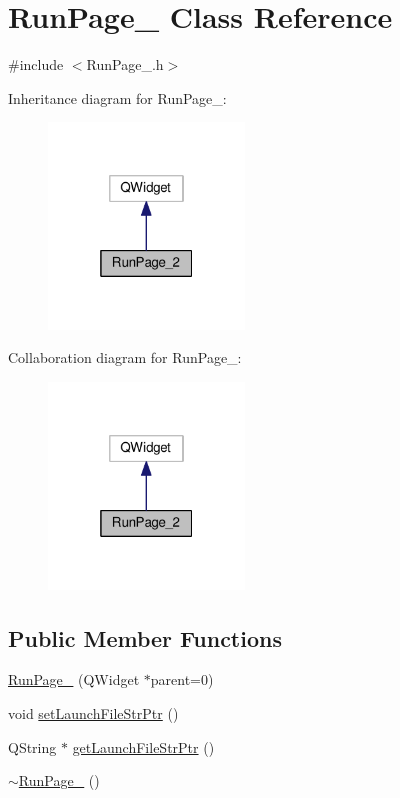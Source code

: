 \hypertarget{class_run_page__2}{\section{Run\-Page\-\_ Class Reference}
\label{class_run_page__2}
}


{\ttfamily \#include $<$Run\-Page\-\_.\-h$>$}



Inheritance diagram for Run\-Page\-\_\-:\nopagebreak
\begin{figure}[H]
\begin{center}
\leavevmode
\includegraphics[width=148pt]{class_run_page__2__inherit__graph}
\end{center}
\end{figure}


Collaboration diagram for Run\-Page\-\_\-:\nopagebreak
\begin{figure}[H]
\begin{center}
\leavevmode
\includegraphics[width=148pt]{class_run_page__2__coll__graph}
\end{center}
\end{figure}
\subsection*{Public Member Functions}
\begin{DoxyCompactItemize}
\item 
\hyperlink{class_run_page__2_a6c183b2d481d952509f2b1f97d48bc8d}{Run\-Page\-\_} (Q\-Widget $\ast$parent=0)
\item 
void \hyperlink{class_run_page__2_ad351ea26fe784be1bfa2cee01a62fd06}{set\-Launch\-File\-Str\-Ptr} ()
\item 
Q\-String $\ast$ \hyperlink{class_run_page__2_af4529d1908e4311aa55cb6dada692d5b}{get\-Launch\-File\-Str\-Ptr} ()
\item 
\hyperlink{class_run_page__2_a430898ec1742595342124faf51be2690}{$\sim$\-Run\-Page\-\_} ()
\end{DoxyCompactItemize}
